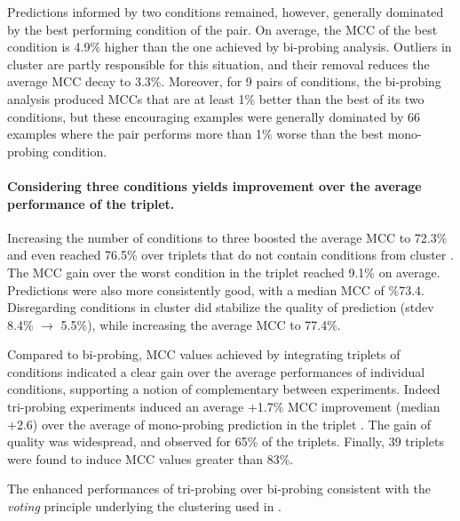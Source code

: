 \documentclass[a4,center,fleqn]{NAR}
\begin{document}
Predictions informed by two conditions remained, however, generally dominated by the best performing condition of the pair. On average, the MCC of the best condition is 4.9\% higher than the one achieved by bi-probing analysis. 
Outliers in cluster  are partly responsible for this situation, and their removal reduces the average MCC decay to 3.3\%. Moreover, for 9 pairs of conditions, the bi-probing analysis produced MCCs that are at least 1\% better than the best of its two conditions, but these encouraging examples were generally dominated by 66 examples where the pair performs more than 1\% worse than the best mono-probing condition.

\paragraph{Considering three conditions yields improvement over the average performance of the triplet.}
Increasing the number of conditions to three boosted the average MCC to 72.3\% and even reached 76.5\% over triplets that do not contain conditions from cluster . The MCC gain over the worst condition in the triplet reached 9.1\% on average.  Predictions were also more consistently good, with a median MCC of \%73.4. Disregarding conditions in cluster  did stabilize the quality of prediction (stdev 8.4\% $\to$ 5.5\%), while increasing the average MCC to 77.4\%.

Compared to bi-probing, MCC values achieved by integrating triplets of conditions indicated a clear gain over the average performances of individual conditions, supporting a notion of complementary between experiments. Indeed tri-probing experiments induced an average +1.7\% MCC improvement (median +2.6) over the average of mono-probing prediction in the triplet . The gain of quality was widespread, and observed for 65\% of the triplets. Finally, 39 triplets were found to induce MCC values greater than 83\%.

The enhanced performances of tri-probing over bi-probing  consistent with the \emph{voting} principle underlying the clustering used in \OurTool. 
\end{document}

